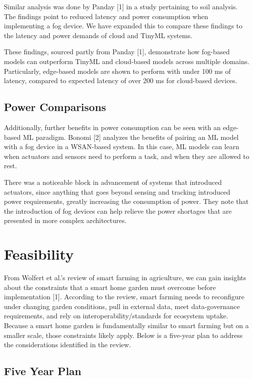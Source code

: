 \documentclass{sigchi}
\begin{document}
Similar analysis was done by Panday [1] in a study pertaining to soil analysis. The findings point to reduced latency and power consumption when implementing a fog device. We have expanded this to compare these findings to the latency and power demands of cloud and TinyML systems.

These findings, sourced partly from Panday [1], demonstrate how fog-based models can outperform TinyML and cloud-based models across multiple domains. Particularly, edge-based models are shown to perform with under 100 ms of latency, compared to expected latency of over 200 ms for cloud-based devices.

\subsection{Power Comparisons}

Additionally, further benefits in power consumption can be seen with an edge-based ML paradigm. Bonomi [2] analyzes the benefits of pairing an ML model with a fog device in a WSAN-based system. In this case, ML models can learn when actuators and sensors need to perform a task, and when they are allowed to rest.

There was a noticeable block in advancement of systems that introduced actuators, since anything that goes beyond sensing and tracking introduced power requirements, greatly increasing the consumption of power. They note that the introduction of fog devices can help relieve the power shortages that are presented in more complex architectures.

\section{Feasibility}

From Wolfert et al.’s review of smart farming in agriculture, we can gain insights about the constraints that a smart home garden must overcome before implementation [1]. According to the review, smart farming needs to reconfigure under changing garden conditions, pull in external data, meet data-governance requirements, and rely on interoperability/standards for ecosystem uptake. Because a smart home garden is fundamentally similar to smart farming but on a smaller scale, those constraints likely apply. Below is a five-year plan to address the considerations identified in the review.

\subsection{Five Year Plan}
\end{document}
